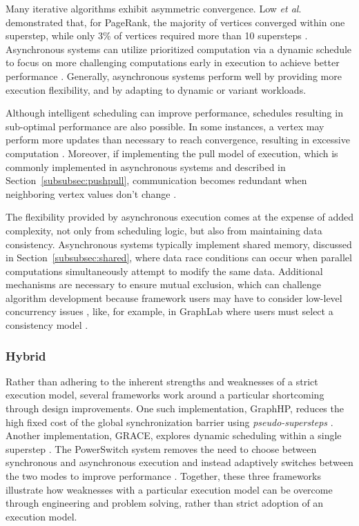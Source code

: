 \documentclass[reprint,twocolumn,showpacs,preprintnumbers,amsmath, aps,pre,amssymb]{revtex4-1}
\begin{document}
Many iterative algorithms exhibit asymmetric convergence.  Low {\em et al}. demonstrated that, for PageRank, the majority of vertices converged within one superstep, while only 3\% of vertices required more than 10 supersteps \cite{Low2012}.  Asynchronous systems can utilize prioritized computation via a dynamic schedule to focus on more challenging computations early in execution to achieve better performance \cite{Zhang2011,Low2012}.  Generally, asynchronous systems perform well by providing more execution flexibility, and by adapting to dynamic or variant workloads.

Although intelligent scheduling can improve performance, schedules resulting in sub-optimal performance are also possible.  In some instances, a vertex may perform more updates than necessary to reach convergence, resulting in excessive computation \cite{Zhang2013}.  Moreover, if implementing the pull model of execution, which is commonly implemented in asynchronous systems \cite{Low2012} and described in Section~\ref{subsubsec:pushpull}, communication becomes redundant when neighboring vertex values don't change \cite{Zhang2013,Hant2014}.

The flexibility provided by asynchronous execution comes at the expense of added complexity, not only from scheduling logic, but also from maintaining data consistency.  Asynchronous systems typically implement shared memory, discussed in Section~\ref{subsubsec:shared}, where data race conditions can occur when parallel computations simultaneously attempt to modify the same data.  Additional mechanisms are necessary to ensure mutual exclusion, which can challenge algorithm development because framework users may have to consider low-level concurrency issues \cite{Wang2013}, like, for example, in GraphLab where users must select a consistency model \cite{Low2012}.

\subsubsection{Hybrid}
\label{subsubsec:hybrid}
Rather than adhering to the inherent strengths and weaknesses of a strict execution model, several frameworks work around a particular shortcoming through design improvements.  One such implementation, GraphHP, reduces the high fixed cost of the global synchronization barrier using {\em pseudo-supersteps} \cite{Chen}. Another implementation, GRACE, explores dynamic scheduling within a single superstep \cite{Wang2013}. The PowerSwitch system removes the need to choose between synchronous and asynchronous execution and instead adaptively switches between the two modes to improve performance \cite{Xie2013}.  Together, these three frameworks illustrate how weaknesses with a particular execution model can be overcome through engineering and problem solving, rather than strict adoption of an execution model.
\end{document}
